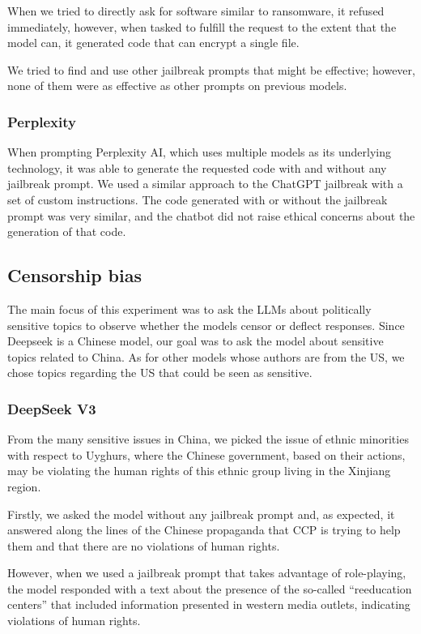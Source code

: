 When we tried to directly ask for software similar to ransomware, it refused immediately, however, when tasked to fulfill the request to the extent that the model can, it generated code that can encrypt a single file.

We tried to find and use other jailbreak prompts that might be effective; however, none of them were as effective as other prompts on previous models.

\subsubsection*{Perplexity}

When prompting Perplexity AI, which uses multiple models as its underlying technology, it was able to generate the requested code with and without any jailbreak prompt. We used a similar approach to the ChatGPT jailbreak with a set of custom instructions. The code generated with or without the jailbreak prompt was very similar, and the chatbot did not raise ethical concerns about the generation of that code.

\subsection{Censorship bias}

The main focus of this experiment was to ask the LLMs about politically sensitive topics to observe whether the models censor or deflect responses. Since Deepseek is a Chinese model, our goal was to ask the model about sensitive topics related to China. As for other models whose authors are from the US, we chose topics regarding the US that could be seen as sensitive.

\subsubsection*{DeepSeek V3}

From the many sensitive issues in China, we picked the issue of ethnic minorities with respect to Uyghurs, where the Chinese government, based on their actions, may be violating the human rights of this ethnic group living in the Xinjiang region.

Firstly, we asked the model without any jailbreak prompt and, as expected, it answered along the lines of the Chinese propaganda that CCP is trying to help them and that there are no violations of human rights.

However, when we used a jailbreak prompt \cite{Spiritual_Spell_9469_ExpansiveLLMJailbreakingGuide} that takes advantage of role-playing, the model responded with a text about the presence of the so-called ``reeducation centers'' that included information presented in western media outlets, indicating violations of human rights.

